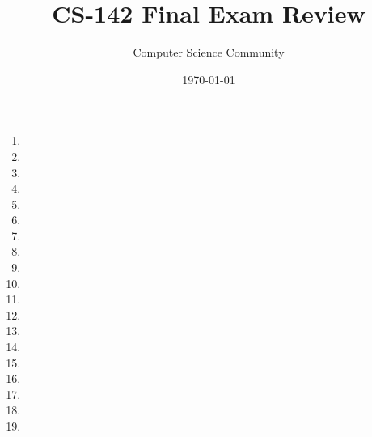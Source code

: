 \documentclass[11pt]{article}
\author{Computer Science Community}
\title{CS-142 Final Exam Review}
\date{\today}
\begin{document}
\header

\begin{enumerate}
\pagebreak
\item 

\item 

\item 

\item 

\pagebreak
\item 

\item 

\pagebreak
\item 
\vspace{1in}

\newpage
\item 

\item 

\item 

\item 

\item 

\item 

\item 

\item 

\item 

\item 

\item 

\item 


\end{enumerate}
\end{document}
